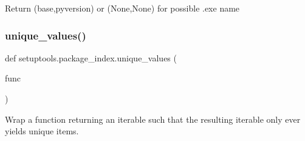 \begin{DoxyVerb}Return (base,pyversion) or (None,None) for possible .exe name\end{DoxyVerb}
 \mbox{\label{namespacesetuptools_1_1package__index_af5a53fb83bee4d01a3dd7e1668bccda6}} 
\subsubsection{\texorpdfstring{unique\+\_\+values()}{unique\_values()}}
{\footnotesize\ttfamily def setuptools.\+package\+\_\+index.\+unique\+\_\+values (\begin{DoxyParamCaption}\item[{}]{func }\end{DoxyParamCaption})}

\begin{DoxyVerb}Wrap a function returning an iterable such that the resulting iterable
only ever yields unique items.
\end{DoxyVerb}
 